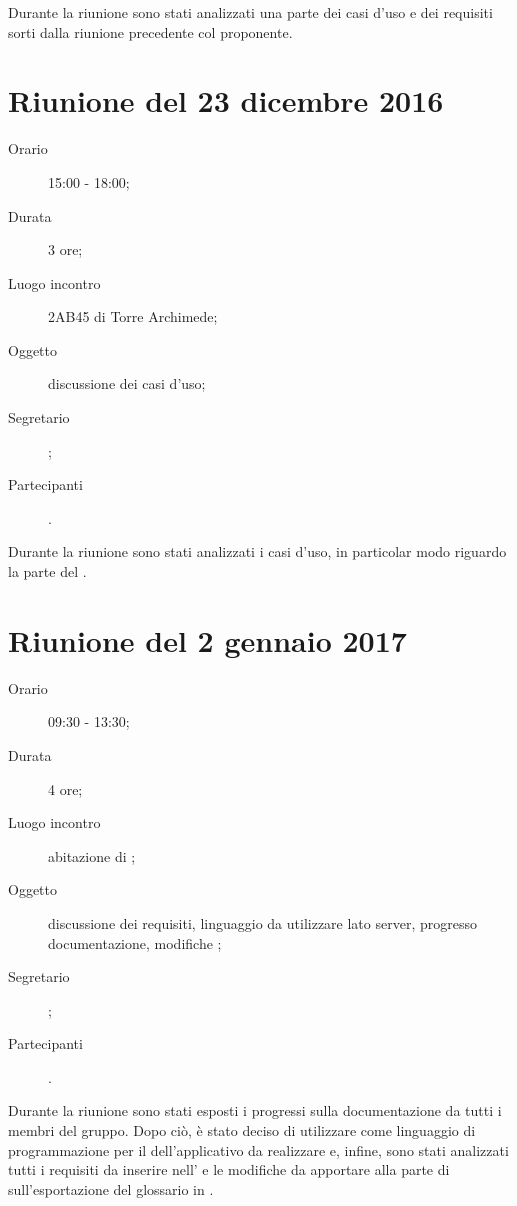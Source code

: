 Durante la riunione sono stati analizzati una parte dei casi d'uso e dei requisiti sorti dalla riunione precedente col proponente.



\section{Riunione del 23 dicembre 2016}

\begin{description}
	\item[Orario] 15:00 - 18:00;
	\item[Durata] 3 ore;
	\item[Luogo incontro] 2AB45 di Torre Archimede; 
	\item[Oggetto] discussione dei casi d'uso;
	\item[Segretario] \PB; 
	\item[Partecipanti] \ALL.
\end{description}

Durante la riunione sono stati analizzati i casi d'uso, in particolar modo riguardo la parte del .



\section{Riunione del 2 gennaio 2017}

\begin{description}
	\item[Orario] 09:30 - 13:30;
	\item[Durata] 4 ore;
	\item[Luogo incontro] abitazione di \PB;
	\item[Oggetto] discussione dei requisiti, linguaggio da utilizzare lato server, progresso documentazione, modifiche ;
	\item[Segretario] \PB; 
	\item[Partecipanti] \ALL.
\end{description}

Durante la riunione sono stati esposti i progressi sulla documentazione da tutti i membri del gruppo. Dopo ciò, è stato deciso di utilizzare  come linguaggio di programmazione per il  dell'applicativo da realizzare e, infine, sono stati analizzati tutti i requisiti da inserire nell'\AdR{} e le modifiche da apportare alla parte  di  sull'esportazione del glossario in .



